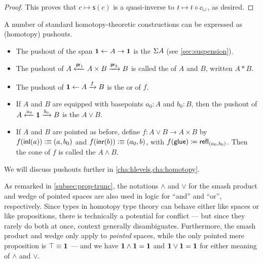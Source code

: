 \begin{proof}
This proves that $c\mapsto\mathsf{s}(c)$ is a quasi-inverse to $t\mapsto{}t\circ c_\sqcup$, as desired.
\end{proof}

A number of standard homotopy-theoretic constructions can be expressed as (homotopy) pushouts.
\begin{itemize}
\item The pushout of the span $\mathbf{1} \leftarrow A \to \mathbf{1}$ is the  $\Sigma A$ (see \cref{sec:suspension}).%
\item The pushout of $A \xleftarrow{\mathsf{pr}_{1}} A\times B \xrightarrow{\mathsf{pr}_{2}} B$ is called the  of $A$ and $B$, written $A*B$.%
\item The pushout of $\mathbf{1} \leftarrow A \xrightarrow{f} B$ is the  or  of $f$.%
\item If $A$ and $B$ are equipped with basepoints $a_0:A$ and $b_0:B$, then the pushout of $A \xleftarrow{a_0} \mathbf{1} \xrightarrow{b_0} B$ is the  $A\vee B$.%
\item If $A$ and $B$ are pointed as before, define $f:A\vee B \to A\times B$ by $f({\mathsf{inl}}(a))\vcentcolon\equiv (a,b_0)$ and $f({\mathsf{inr}}(b))\vcentcolon\equiv (a_0,b)$, with ${f}\mathopen{}\left({\mathsf{glue}}\right)\mathclose{} \coloneqq \mathsf{refl}_{(a_0,b_0)}$.
  Then the cone of $f$ is called the  $A\wedge B$.%
\end{itemize}
We will discuss pushouts further in \cref{cha:hlevels,cha:homotopy}.

\begin{rmk}
  As remarked in \cref{subsec:prop-trunc}, the notations $\wedge$ and $\vee$ for the smash product and wedge of pointed spaces are also used in logic for ``and'' and ``or'', respectively.
  Since types in homotopy type theory can behave either like spaces or like propositions, there is technically a potential for conflict --- but since they rarely do both at once, context generally disambiguates.
  Furthermore, the smash product and wedge only apply to \emph{pointed} spaces, while the only pointed mere proposition is $\top\equiv\mathbf{1}$ --- and we have $\mathbf{1}\wedge \mathbf{1} = \mathbf{1}$ and $\mathbf{1}\vee\mathbf{1}=\mathbf{1}$ for either meaning of $\wedge$ and $\vee$.
\end{rmk}

%

